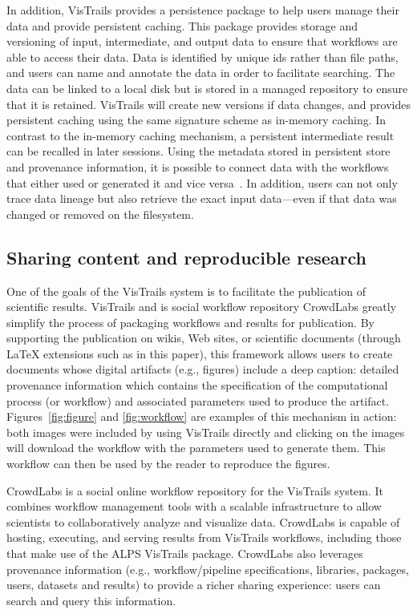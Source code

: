 \documentclass[12pt]{iopart}
\newcommand{\eg}{e.g.,\xspace}
\begin{document}
In addition, VisTrails provides a persistence package to help users
manage their data and provide persistent caching.  This package
provides storage and versioning of input, intermediate, and output
data to ensure that workflows are able to access their data.  Data is
identified by unique ids rather than file paths, and users can name
and annotate the data in order to facilitate searching.  The data can
be linked to a local disk but is stored in a managed repository to
ensure that it is retained.  VisTrails will create new versions if
data changes, and provides persistent caching using the same signature
scheme as in-memory caching.  In contrast to the in-memory caching
mechanism, a persistent intermediate result can be recalled in later
sessions.  Using the metadata stored in persistent store and
provenance information, it is possible to connect data with the
workflows that either used or generated it and vice
versa~\cite{koop@ssdbm2010}.  In addition, users can not only trace
data lineage but also retrieve the exact input data---even if that
data was changed or removed on the filesystem.


\subsection{Sharing content and reproducible research}

One of the goals of the VisTrails system is to
facilitate the publication of scientific results. VisTrails and is social workflow repository
CrowdLabs greatly simplify the process of packaging workflows and
results for publication. By supporting the publication on wikis, 
Web sites, or scientific documents (through LaTeX extensions such as in this paper), this framework allows users to create
documents whose digital artifacts (\eg figures) include a deep
caption: detailed provenance information which contains the
specification of the computational process (or workflow) and
associated parameters used to produce the
artifact. Figures~\ref{fig:figure} and \ref{fig:workflow} are examples
of this mechanism in action: both images were included by using
VisTrails directly and clicking on the images will download the
workflow with the parameters used to generate them. This workflow can then be used by the reader to reproduce the figures.

CrowdLabs is a social online workflow repository for the VisTrails
system. It combines workflow management tools with a scalable
infrastructure to allow scientists to collaboratively analyze and
visualize data. CrowdLabs is capable of hosting, executing, and
serving results from VisTrails workflows, including those that make
use of the ALPS VisTrails package. CrowdLabs also leverages provenance
information (\eg workflow/pipeline specifications, libraries,
packages, users, datasets and results) to provide a richer sharing
experience: users can search and query this information.
\end{document}
